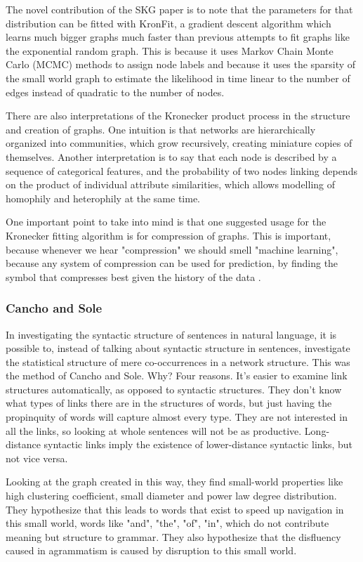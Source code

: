 \documentclass[12pt]{article}
\begin{document}
The novel contribution of the SKG paper is to note that the parameters for that distribution can be fitted with KronFit, a gradient descent algorithm which learns much bigger graphs much faster than previous attempts to fit graphs like the exponential random graph. This is because it uses Markov Chain Monte Carlo (MCMC) methods to assign node labels and because it uses the sparsity of the small world graph to estimate the likelihood in time linear to the number of edges instead of quadratic to the number of nodes.

There are also interpretations of the Kronecker product process in the structure and creation of graphs. One intuition is that networks are hierarchically organized into communities, which grow recursively, creating miniature copies of themselves. Another interpretation is to say that each node is described by a sequence of categorical features, and the probability of two nodes linking depends on the product of individual attribute similarities, which allows modelling of homophily and heterophily at the same time.

One important point to take into mind is that one suggested usage for the Kronecker fitting algorithm is for compression of graphs. This is important, because whenever we hear "compression" we should smell "machine learning", because any system of compression can be used for prediction, by finding the symbol that compresses best given the history of the data \cite{mlcompression}.

\subsubsection*{Cancho and Sole}

In investigating the syntactic structure of sentences in natural language, it is possible to, instead of talking about syntactic structure in sentences, investigate the statistical structure of mere co-occurrences in a network structure. This was the method of Cancho and Sole. Why? Four reasons. It's easier to examine link structures automatically, as opposed to syntactic structures. They don't know what types of links there are in the structures of words, but just having the propinquity of words will capture almost every type. They are not interested in all the links, so looking at whole sentences will not be as productive. Long-distance syntactic links imply the existence of lower-distance syntactic links, but not vice versa. %

Looking at the graph created in this way, they find small-world properties like high clustering coefficient, small diameter and power law degree distribution. They hypothesize that this leads to words that exist to speed up navigation in this small world, words like "and", "the", "of", "in", which do not contribute meaning but structure to grammar. They also hypothesize that the disfluency caused in agrammatism is caused by disruption to this small world.
\end{document}
